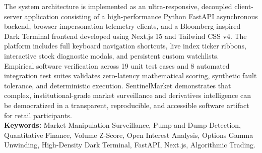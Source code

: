 \noindent The system architecture is implemented as an ultra-responsive, decoupled client-server application consisting of a high-performance Python FastAPI asynchronous backend, browser impersonation telemetry clients, and a Bloomberg-inspired Dark Terminal frontend developed using Next.js 15 and Tailwind CSS v4. The platform includes full keyboard navigation shortcuts, live index ticker ribbons, interactive stock diagnostic modals, and persistent custom watchlists.\\[0.4cm]

\noindent Empirical software verification across 19 unit test cases and 8 automated integration test suites validates zero-latency mathematical scoring, synthetic fault tolerance, and deterministic execution. SentinelMarket demonstrates that complex, institutional-grade market surveillance and derivatives intelligence can be democratized in a transparent, reproducible, and accessible software artifact for retail participants.\\[0.8cm]

\noindent \textbf{Keywords:} Market Manipulation Surveillance, Pump-and-Dump Detection, Quantitative Finance, Volume Z-Score, Open Interest Analysis, Options Gamma Unwinding, High-Density Dark Terminal, FastAPI, Next.js, Algorithmic Trading.

\newpage
